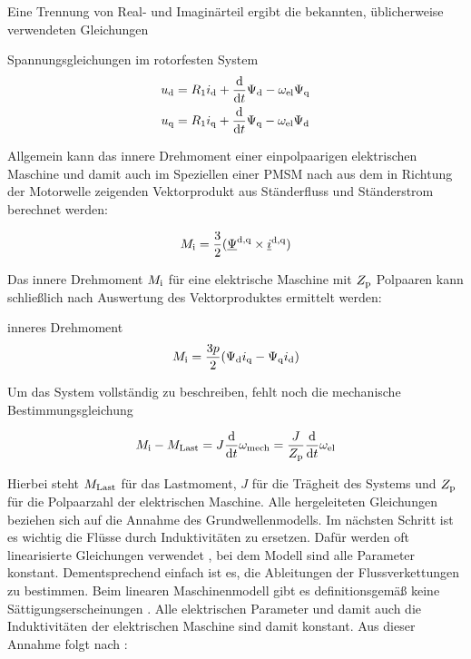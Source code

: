 Eine Trennung von Real- und Imaginärteil ergibt die bekannten, üblicherweise verwendeten Gleichungen \autocite{schroder2001}

\begin{shaded}
	Spannungsgleichungen im rotorfesten System
	\begin{align}
		u_{\mathrm{d}} &= R_{\mathrm{1}}i_{\mathrm{d}} + \frac{\mathrm{d}}{\mathrm{d}t}\Psi_{\mathrm{d}}-\omega_{\mathrm{el}}\Psi_{\mathrm{q}} \label{eqn:ud-gleichung}\\
		u_{\mathrm{q}} &= R_{\mathrm{1}}i_{\mathrm{q}} + \frac{\mathrm{d}}{\mathrm{d}t}\Psi_{\mathrm{q}}-\omega_{\mathrm{el}}\Psi_{\mathrm{d}} \label{eqn:uq-gleichung}
	\end{align}
\end{shaded}

Allgemein kann das innere Drehmoment einer einpolpaarigen elektrischen Maschine und damit auch im Speziellen einer PMSM nach \textcite{kellner2012} aus dem in Richtung der Motorwelle zeigenden Vektorprodukt aus Ständerfluss und Ständerstrom berechnet werden:

\begin{align}
	M_{\mathrm{i}} = \frac{3}{2}(\underline{\Psi}^{\mathrm{d,q}} \times \underline{i}^{\mathrm{d,q}}) 
\end{align}

Das innere Drehmoment $M_{\mathrm{i}}$ für eine elektrische Maschine mit $Z_{\mathrm{p}}$ Polpaaren kann schließlich nach Auswertung des Vektorproduktes ermittelt werden:

\begin{shaded}
	inneres Drehmoment
	\begin{align}
M_{\mathrm{i}} = \frac{3p}{2} ( \Psi_{\mathrm{d}}i_{\mathrm{q}} - \Psi_{\mathrm{q}}i_{\mathrm{d}} ) \label{eqn:mi-gleichung}
	\end{align}
\end{shaded}

Um das System vollständig zu beschreiben, fehlt noch die mechanische Bestimmungsgleichung

\begin{align}
	M_{\mathrm{i}} - M_{\mathrm{Last}} = J \frac{\mathrm{d}}{\mathrm{d}t}\omega_{\mathrm{mech}} = \frac{J}{Z_{\mathrm{p}}} \frac{\mathrm{d}}{\mathrm{d}t}\omega_{\mathrm{el}} \label{eqn:mechanische-gleichung}
\end{align}

Hierbei steht $M_{\mathrm{Last}}$ für das Lastmoment, $J$ für die Trägheit des Systems und $Z_{\mathrm{p}}$ für die Polpaarzahl der elektrischen Maschine.
Alle hergeleiteten Gleichungen beziehen sich auf die Annahme des Grundwellenmodells.
Im nächsten Schritt ist es wichtig die Flüsse durch Induktivitäten zu ersetzen.
Dafür werden oft linearisierte Gleichungen verwendet \autocite{schroder2001}, bei dem Modell sind alle Parameter konstant.
Dementsprechend einfach ist es, die Ableitungen der Flussverkettungen zu bestimmen.
Beim linearen Maschinenmodell gibt es definitionsgemäß keine Sättigungserscheinungen \autocites{mullerII2008}{schroder2001}.
Alle elektrischen Parameter und damit auch die Induktivitäten der elektrischen Maschine sind damit konstant.
Aus dieser Annahme folgt nach \autocite{schroder2001}:

